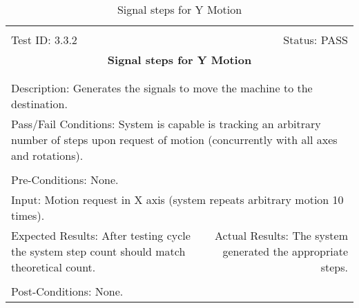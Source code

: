 \documentclass[titlepage]{article}
\begin{document}
\begin{center}
\begin{table}[h!]
\begin{tabular}{|l r|}\hline&\\[-2mm]
	Test ID: 3.3.2	&Status: PASS\\[-3mm]
	\multicolumn{2}{|c|}{\textbf{\large{Signal steps for Y Motion}}}\\&\\\hline&\\[-3mm]
	\multicolumn{2}{|p{\textwidth}|}{Description: Generates the signals to move the machine to the destination.}\\\hline
	\multicolumn{2}{|p{\textwidth}|}{Pass/Fail Conditions: System is capable is tracking an arbitrary number of steps upon request of motion (concurrently with all axes and rotations).}\\[1mm]\hline&\\[-3mm]
	\multicolumn{2}{|p{\textwidth}|}{Pre-Conditions: None.}\\[4mm]
	\multicolumn{2}{|p{\textwidth}|}{Input: Motion request in X axis (system repeats arbitrary motion 10 times).}\\[2mm]\hline
	\multicolumn{1}{|p{0.49\textwidth}}{Expected Results: After testing cycle the system step count should match theoretical count.}	&\multicolumn{1}{|p{0.45\textwidth}|}{Actual Results: The system generated the appropriate steps.}\\\hline&\\[-3mm]
	\multicolumn{2}{|p{\textwidth}|}{Post-Conditions: None.}\\\hline
\end{tabular}
\caption{Signal steps for Y Motion}
\end{table}
\end{center}
\newpage
\end{document}

